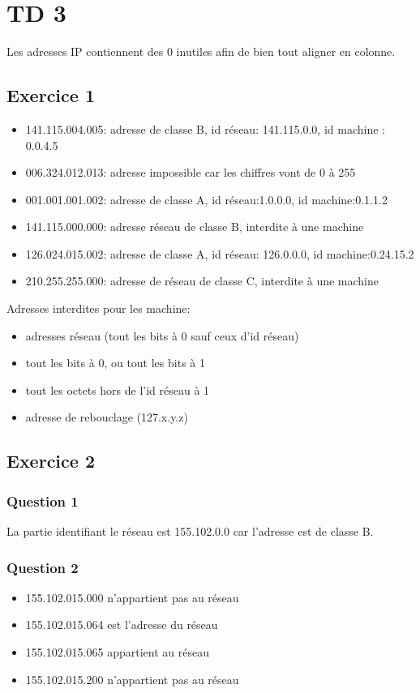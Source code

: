 \section{TD 3}
Les adresses IP contiennent des 0 inutiles afin de bien tout aligner en colonne.
\subsection{Exercice 1}
\begin{itemize}
	\item 141.115.004.005: adresse de classe B, id réseau: 141.115.0.0, id machine : 0.0.4.5
	\item 006.324.012.013: adresse impossible car les chiffres vont de 0 à 255
	\item 001.001.001.002: adresse de classe A, id réseau:1.0.0.0, id machine:0.1.1.2
	\item 141.115.000.000: adresse réseau de classe B, interdite à une machine
	\item 126.024.015.002: adresse de classe A, id réseau: 126.0.0.0, id machine:0.24.15.2
	\item 210.255.255.000: adresse de réseau de classe C, interdite à une machine
\end{itemize}

Adresses interdites pour les machine:
\begin{itemize}
	\item adresses réseau (tout les bits à 0 sauf ceux d'id réseau)
	\item tout les bits à 0, ou tout les bits à 1
	\item tout les octets hors de l'id réseau à 1
	\item adresse de rebouclage (127.x.y.z)
\end{itemize}

\subsection{Exercice 2}
\subsubsection{Question 1}
La partie identifiant le réseau est 155.102.0.0 car l'adresse est de classe B.
\subsubsection{Question 2}
\begin{itemize}
	\item 155.102.015.000 n'appartient pas au réseau
	\item 155.102.015.064 est l'adresse du réseau
	\item 155.102.015.065 appartient au réseau
	\item 155.102.015.200 n'appartient pas au réseau
\end{itemize}

